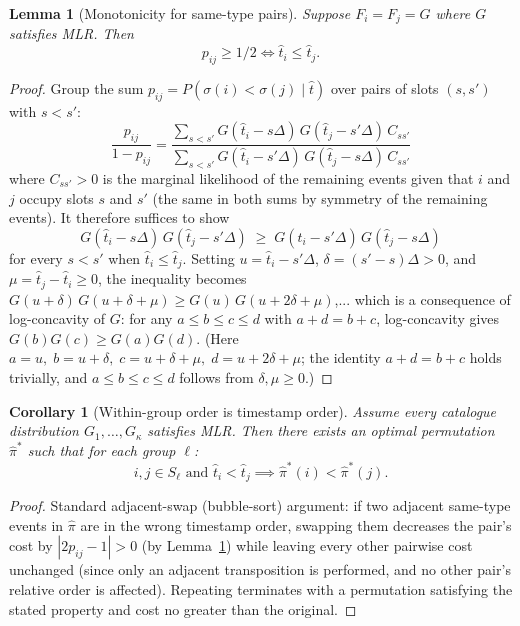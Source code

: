 \documentclass[11pt]{article}
\newtheorem{lemma}[theorem]{Lemma}
\newtheorem{corollary}[theorem]{Corollary}
\begin{document}
\begin{lemma}[Monotonicity for same-type pairs]\label{lem:same-type}
Suppose $F_i = F_j = G$ where $G$ satisfies MLR\@.  Then
\[
  p_{ij} \ge 1/2 \iff \hat{t}_i \le \hat{t}_j.
\]
\end{lemma}

\begin{proof}
Group the sum $p_{ij} = P(\sigma(i) < \sigma(j)\mid\hat{t})$ over pairs of slots
$(s, s')$ with $s < s'$:
\[
  \frac{p_{ij}}{1 - p_{ij}}
  = \frac{\displaystyle\sum_{s < s'} G(\hat{t}_i - s\Delta)\,G(\hat{t}_j - s'\Delta)\,C_{ss'}}
         {\displaystyle\sum_{s < s'} G(\hat{t}_i - s'\Delta)\,G(\hat{t}_j - s\Delta)\,C_{ss'}}
\]
where $C_{ss'} > 0$ is the marginal likelihood of the remaining events given that $i$
and $j$ occupy slots $s$ and $s'$ (the same in both sums by symmetry of the remaining
events).  It therefore suffices to show
\[
  G(\hat{t}_i - s\Delta)\,G(\hat{t}_j - s'\Delta)
  \;\ge\;
  G(\hat{t}_i - s'\Delta)\,G(\hat{t}_j - s\Delta)
\]
for every $s < s'$ when $\hat{t}_i \le \hat{t}_j$.  Setting $u = \hat{t}_i - s'\Delta$,
$\delta = (s'-s)\Delta > 0$, and $\mu = \hat{t}_j - \hat{t}_i \ge 0$, the inequality
becomes $G(u+\delta)\,G(u+\delta+\mu) \ge G(u)\,G(u+2\delta+\mu)$,... which is a
consequence of log-concavity of $G$: for any $a \le b \le c \le d$ with $a + d = b +
c$, log-concavity gives $G(b)G(c) \ge G(a)G(d)$.  (Here $a = u,\; b = u+\delta,\;
c = u+\delta+\mu,\; d = u+2\delta+\mu$; the identity $a+d = b+c$ holds trivially, and
$a \le b \le c \le d$ follows from $\delta, \mu \ge 0$.)
\end{proof}

\begin{corollary}[Within-group order is timestamp order]\label{cor:within-group}
Assume every catalogue distribution $G_1, \ldots, G_\kappa$ satisfies MLR\@.  Then
there exists an optimal permutation $\hat{\pi}^*$ such that for each group $\ell$:
\[
  i, j \in S_\ell \text{ and } \hat{t}_i < \hat{t}_j
  \implies \hat{\pi}^*(i) < \hat{\pi}^*(j).
\]
\end{corollary}

\begin{proof}
Standard adjacent-swap (bubble-sort) argument: if two adjacent same-type events in
$\hat{\pi}$ are in the wrong timestamp order, swapping them decreases the pair's cost
by $|2p_{ij}-1| > 0$ (by Lemma~\ref{lem:same-type}) while leaving every other
pairwise cost unchanged (since only an adjacent transposition is performed, and no
other pair's relative order is affected).  Repeating terminates with a permutation
satisfying the stated property and cost no greater than the original.
\end{proof}
\end{document}
